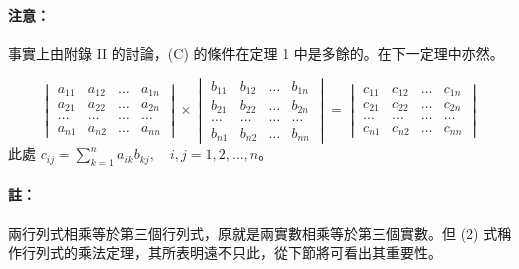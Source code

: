 \paragraph{注意：}事實上由附錄 II 的討論，(C) 的條件在定理 1 中是多餘的。在下一定理中亦然。

\begin{theorem}[行列式的乘法定理]\label{thm:b6-1-13}
\begin{equation}
\begin{vmatrix}
a_{11} & a_{12} & \dots & a_{1n} \\
a_{21} & a_{22} & \dots & a_{2n} \\
\dots & \dots & \dots & \dots \\
a_{n1} & a_{n2} & \dots & a_{nn}
\end{vmatrix} \times \begin{vmatrix}
b_{11} & b_{12} & \dots & b_{1n} \\
b_{21} & b_{22} & \dots & b_{2n} \\
\dots & \dots & \dots & \dots \\
b_{n1} & b_{n2} & \dots & b_{nn}
\end{vmatrix} = \begin{vmatrix}
c_{11} & c_{12} & \dots & c_{1n} \\
c_{21} & c_{22} & \dots & c_{2n} \\
\dots & \dots & \dots & \dots \\
c_{n1} & c_{n2} & \dots & c_{nn}
\end{vmatrix} \label{eq:b6-1-6-2}
\end{equation}
此處 $c_{ij} = \sum_{k=1}^n a_{ik} b_{kj}, \quad i, j = 1, 2, \dots, n$。
\end{theorem}

\paragraph{註：}兩行列式相乘等於第三個行列式，原就是兩實數相乘等於第三個實數。但 (2) 式稱作行列式的乘法定理，其所表明遠不只此，從下節將可看出其重要性。

